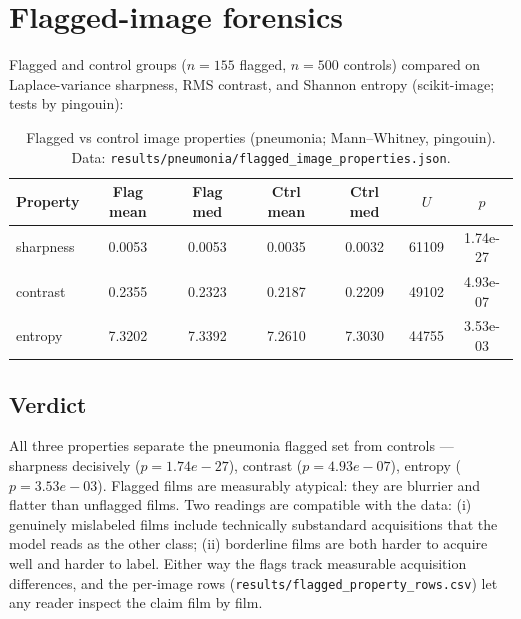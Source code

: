 \section{Flagged-image forensics}
Flagged and control groups ($n=155$ flagged, $n=500$ controls) compared on Laplace-variance sharpness, RMS contrast, and Shannon entropy (scikit-image; tests by pingouin):
\begin{table}[h]\centering\small
\begin{tabular}{lcccccc}
\hline
Property & Flag mean & Flag med & Ctrl mean & Ctrl med & $U$ & $p$ \\
\hline
sharpness & 0.0053 & 0.0053 & 0.0035 & 0.0032 & 61109 & 1.74e-27 \\
contrast & 0.2355 & 0.2323 & 0.2187 & 0.2209 & 49102 & 4.93e-07 \\
entropy & 7.3202 & 7.3392 & 7.2610 & 7.3030 & 44755 & 3.53e-03 \\
\hline
\end{tabular}
\caption{Flagged vs control image properties (pneumonia; Mann--Whitney, pingouin). Data: \texttt{results/pneumonia/flagged\_image\_properties.json}.}\label{tab:forensics}
\end{table}

\subsection{Verdict}
All three properties separate the pneumonia flagged set from controls ---
sharpness decisively ($p=1.74e-27$), contrast
($p=4.93e-07$), entropy ($p=3.53e-03$).
Flagged films are measurably atypical: they are blurrier and flatter than
unflagged films. Two readings are compatible with the data: (i) genuinely
mislabeled films include technically substandard acquisitions that the
model reads as the other class; (ii) borderline films are both harder to
acquire well and harder to label. Either way the flags track measurable
acquisition differences, and the per-image rows
(\texttt{results/flagged\_property\_rows.csv}) let any reader inspect
the claim film by film.
